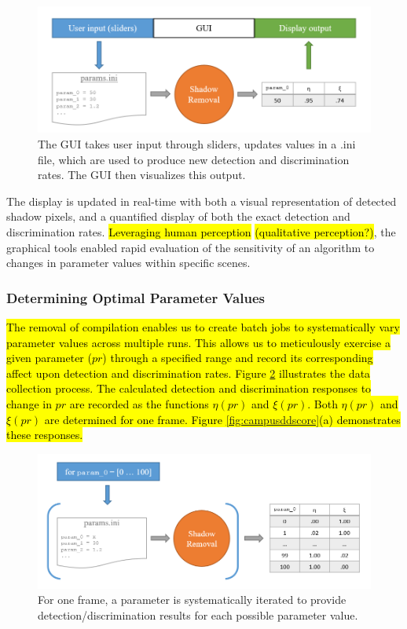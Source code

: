 \documentclass[12pt]{report}
\begin{document}
\begin{figure}
  \centering
  \includegraphics[width=1\linewidth]{figures/gui_model.png}
  \caption{The GUI takes user input through sliders, updates values in a .ini file, which are used to produce new detection and discrimination rates. The GUI then visualizes this output.}
  \label{fig:guimodel}
\end{figure}

The display is updated in real-time with both a visual representation of detected shadow pixels, and a quantified display of both the exact detection and discrimination rates. \hl{Leveraging human perception} \hl{(qualitative perception?)}, the graphical tools enabled rapid evaluation of the sensitivity of an algorithm to changes in parameter values within specific scenes.

\subsubsection{Determining Optimal Parameter Values}

\hl{The removal of compilation enables us to create batch jobs to systematically vary parameter values across multiple runs. This allows us to meticulously exercise a given parameter ($pr$) through a specified range and record its corresponding affect upon detection and discrimination rates. Figure \ref{fig:guiiterate} illustrates the data collection process. The calculated detection and discrimination responses to change in $pr$ are recorded as the functions $\eta(pr)$ and $\xi(pr)$. Both $\eta(pr)$ and $\xi(pr)$ are determined for one frame. Figure \ref{fig:campusddscore}(a) demonstrates these responses.}

\begin{figure}
  \centering
  \includegraphics[width=1\linewidth]{figures/gui_iterate.png}
  \caption{For one frame, a parameter is systematically iterated to provide detection/discrimination results for each possible parameter value.}
  \label{fig:guiiterate}
\end{figure}
\end{document}
